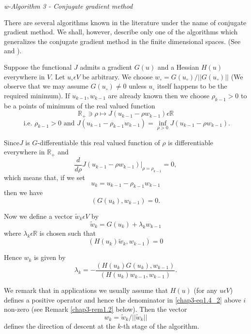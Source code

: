 {\em w-Algorithm 3 - Conjugate gradient method}

There are several algorithms known in the literature under the name of conjugate gradient method. We shall, however, describe only one of the algorithms which generalizes the conjugate gradient method in the finite dimensional spaces. (See \cite{key20} \cite{key22} and \cite{key24}).

Suppose the functional $J$ admits a gradient $G(u)$ and a Hessian $H(u)$ everywhere in $V$. Let $u_{\circ} \epsilon V$ be arbitrary. We choose $w_{\circ} = G(u_{\circ})/ ||G(u_{\circ})||$ (We observe that we may assume $G(u_{\circ}) \neq 0$ unless $u_{\circ}$ itself happens to be the required minimum). If $u_{k-1}, w_{k-1}$ are already known then we choose $\rho_{k-1} > 0$ to be a points of minimum of the real valued function
$$
\mathbb{R}_{+} \ni \rho \mapsto J(u_{k-1} - \rho w_{k-1}) \epsilon \mathbb{R}
$$
$$
\text{ i.e. } \rho_{k-1} > 0 \text{ and } J(u_{k-1} - \rho_{k-1} w_{k-1}) = \inf\limits_{\rho > 0} J(u_{k-1} - \rho w_{k-1}).
$$

Since\pageoriginale $J$ is $G$-differentiable this real valued function of $\rho$ is differentiable everywhere in $\mathbb{R}_{+}$ and
$$
\dfrac{d}{d\rho} J(u_{k-1} -\rho w_{k-1}) |_{\rho=\rho_{k-1}} = 0,
$$
which means that, if we set
\begin{equation*}
u_{k} = u_{k-1} - \rho_{k-1} w_{k-1}\tag*{$(1.4)_1$}\label{chap3-eq1.4_1}
\end{equation*}
then we have
\begin{equation*}
(G(u_{k}), w_{k-1}) = 0.\tag{1.5}\label{chap3-eq1.5}
\end{equation*}

Now we define a vector $\widetilde{w}_{k} \epsilon V$ by
$$
\widetilde{w}_{k} = G(u_{k}) + \lambda_{k} w_{k-1}
$$
where $\lambda_{k} \epsilon \mathbb{R}$ is chosen such that
$$
(H(u_{k}) \widetilde{w}_{k}, w_{k-1}) = 0
$$

Hence $w_{k}$ is given by
\begin{equation*}
\lambda_{k} = -\dfrac{(H(u_{k})G(u_{k}), w_{k-1})}{(H(u_{k})w_{k-1}, w_{k-1})}.\tag*{$(1.4)_2$}\label{chap3-eq1.4_2}
\end{equation*}

We remark that in applications we usually assume that $H(u)$ (for any $u \epsilon V$) defines a positive operator and hence the denominator in \ref{chap3-eq1.4_2} above $i$ non-zero (see Remark \ref{chap3-rem1.2} below). Then the vector
\begin{equation*}
w_{k} = \widetilde{w}_{k} / ||\widetilde{w}_{k}||\tag*{$(1.4)_3$}\label{chap3-eq1.4_3}
\end{equation*}
defines the direction of descent at the $k$-th stage of the algorithm.

